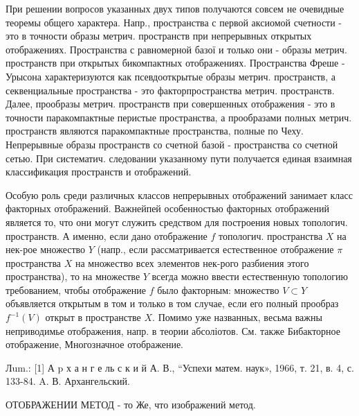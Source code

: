 \documentclass[10pt]{article}
\begin{document}
При решении вопросов указанных двух типов получаются совсем не очевидные теоремы общего характера. Напр., пространства с первой аксиомой счетности - это в точности образы метрич. пространств при непрерывных открытых отображениях. Пространства с равномерной базої и только они - образы метрич. пространств при открытых бикомпактных отображениях. Пространства Фреше - Урысона характеризуются как псевдооткрытые образы метрич. пространств, а секвенциальные пространства - это факторпространства метрич. пространств. Далее, прообразы метрич. пространств при совершенных отображения - это в точности паракомпактные перистые пространства, а прообразами полных метрич. пространств являются паракомпактные пространства, полные по Чеху. Непрерывные образы пространств со счетной базой - пространства со счетной сетью. При систематич. следовании указанному пути получается единая взаимная классификация пространств и отображений.

Особую роль среди различных классов непрерывных отображений занимает класс факторных отображений. Важнейпей особенностью факторных отображений является то, что они могут служить средством для построения новых топологич. пространств. А именно, если дано отображение $f$ топологич. пространства $X$ на нек-рое множество $Y$ (напр., если рассматривается естественное отображение $\pi$ пространства $X$ на множество всех элементов нек-рого разбиения этого пространства), то на множестве $Y$ всегда можно ввести естественную топологию требованием, чтобы отображение $f$ было факторным: множество $V \subset Y$ объявляется открытым в том и только в том случае, если его полный прообраз $f^{-1}(V)$ открыт в пространстве $X$. Помимо уже названных, весьма важны неприводимье отображения, напр. в теории абсоліотов. См. также Бибакторное отображение, Многозначное отображение.

Лum.: [1] А p х а н г е ль с к и й А. В., “Успехи матем. наук», 1966, т. 21, в. 4, с. 133-84. A. В. Архангельский.

ОТОБРАЖЕНИИ МЕТОД - то Же, что изображений метод.
\end{document}
